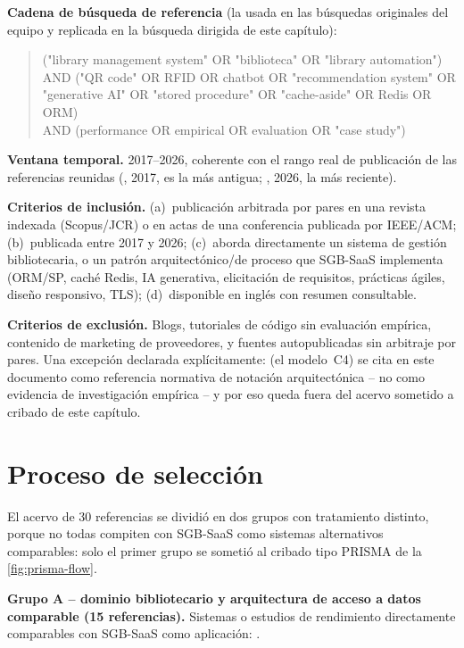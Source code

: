 \textbf{Cadena de búsqueda de referencia} (la usada en las búsquedas
originales del equipo y replicada en la búsqueda dirigida de este
capítulo):

\begin{quote}
\ttfamily
("library management system" OR "biblioteca" OR "library automation")\\
AND ("QR code" OR RFID OR chatbot OR "recommendation system" OR\\
\phantom{AND (}"generative AI" OR "stored procedure" OR "cache-aside" OR Redis OR ORM)\\
AND (performance OR empirical OR evaluation OR "case study")
\end{quote}

\textbf{Ventana temporal.} 2017--2026, coherente con el rango real de
publicación de las referencias reunidas (\citet{kusuma2017rediscaching},
2017, es la más antigua; \citet{ayinde2026ai}, 2026, la más reciente).

\textbf{Criterios de inclusión.} (a)~publicación arbitrada por pares en
una revista indexada (Scopus/JCR) o en actas de una conferencia
publicada por IEEE/ACM; (b)~publicada entre 2017 y 2026; (c)~aborda
directamente un sistema de gestión bibliotecaria, o un patrón
arquitectónico/de proceso que SGB-SaaS implementa (ORM/SP, caché Redis,
IA generativa, elicitación de requisitos, prácticas ágiles, diseño
responsivo, TLS); (d)~disponible en inglés con resumen consultable.

\textbf{Criterios de exclusión.} Blogs, tutoriales de código sin
evaluación empírica, contenido de marketing de proveedores, y fuentes
autopublicadas sin arbitraje por pares. Una excepción declarada
explícitamente: \citet{brown2023c4model} (el modelo~C4) se cita en este
documento como referencia normativa de notación arquitectónica -- no
como evidencia de investigación empírica -- y por eso queda fuera del
acervo sometido a cribado de este capítulo.

\section{Proceso de selección}
\label{sec:proceso-seleccion}

El acervo de 30 referencias se dividió en dos grupos con tratamiento
distinto, porque no todas compiten con SGB-SaaS como sistemas
alternativos comparables: solo el primer grupo se sometió al cribado
tipo PRISMA de la \autoref{fig:prisma-flow}.

\textbf{Grupo A -- dominio bibliotecario y arquitectura de acceso a
datos comparable (15 referencias).} Sistemas o estudios de rendimiento
directamente comparables con SGB-SaaS como aplicación:
\citet{ayinde2026ai, liabor2023cataloging, shivaji2024intelligentlms,
rajacic2025gdpr, supriyono2018qr, ng2024libbot, mukund2021rfid,
adetayo2023chatgpt, yan2023chatbotsslr, ehrenpreis2022chatbot,
wayesa2023recsys, hu2025bigdata, ayemowa2024genai,
colley2018ormperformance, kusuma2017rediscaching}.

